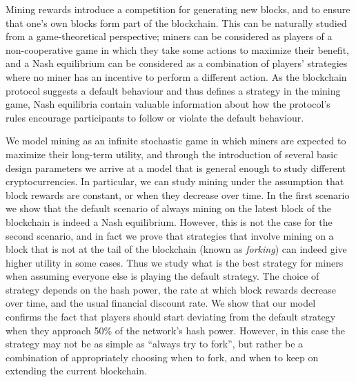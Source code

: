 \smallskip
{} Mining rewards introduce a competition for generating new blocks, and to ensure that one's own blocks form part of the blockchain. This can be naturally studied from a game-theoretical perspective; miners can be considered as players of a non-cooperative game in which they take some actions to maximize their benefit, and a Nash equilibrium can be considered as a combination of players' strategies where no miner has an incentive to perform a different action. As the blockchain protocol suggests a default behaviour and thus defines a strategy in the mining game, Nash equilibria contain valuable information about how the protocol's rules encourage participants to follow or violate the default behaviour. 

We model mining as an infinite stochastic game in which miners are expected to maximize their long-term utility, and through the introduction of several 
basic design parameters we arrive at a model that is general enough to study different cryptocurrencies. In particular, we can study mining under the assumption that block rewards are constant, or when they decrease over time. In the first scenario we show that 
the default scenario of always mining on the latest block of the blockchain is indeed a Nash equilibrium. However, this is not the case for the second scenario, and in fact we 
prove that strategies that involve mining on a block that is not at the tail of the blockchain (known as \emph{forking}) can indeed give higher utility in some cases. Thus we study 
what is the best strategy for miners when assuming everyone else is playing the default strategy. The choice of strategy depends on the hash power, the rate at which 
block rewards decrease over time, and the usual financial discount rate. We show that our model confirms the fact that players should start deviating from the default strategy 
when they approach 50\% of the network's hash power. However, in this case the strategy may not be as simple as ``always try to fork'', but rather be a combination 
of appropriately choosing when to fork, and when to keep on extending the current blockchain. 





